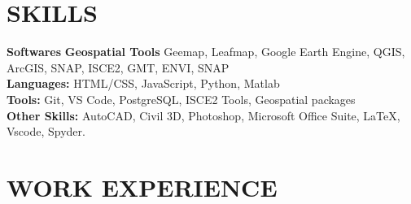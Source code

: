 \documentclass[a4paper,10pt]{article}
\begin{document}
\section*{SKILLS}
\textbf{Softwares}
\textbf{Geospatial Tools} Geemap, Leafmap, Google Earth Engine, QGIS, ArcGIS, 
SNAP, ISCE2, GMT, ENVI, SNAP\\
\textbf{Languages:}  HTML/CSS, JavaScript, Python, Matlab\\
\textbf{Tools:} Git, VS Code, PostgreSQL, ISCE2 Tools, Geospatial packages\\
\textbf{Other Skills:} AutoCAD, Civil 3D, Photoshop, Microsoft Office Suite, LaTeX, Vscode, Spyder.


\section*{WORK EXPERIENCE}
\end{document}
